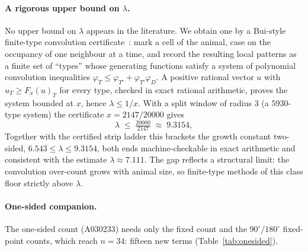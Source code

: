 \documentclass[11pt]{article}
\begin{document}
\paragraph{A rigorous upper bound on $\lambda$.}
No upper bound on $\lambda$ appears in the literature. We obtain one by a
Bui-style finite-type convolution certificate~\cite{bui2025}: mark a cell of the
animal, case on the occupancy of one neighbour at a time, and record the
resulting local patterns as a finite set of ``types'' whose generating functions
satisfy a system of polynomial convolution inequalities
$\varphi_T \le \varphi_{T'} + \varphi_{T'}\varphi_D$. A positive rational vector
$u$ with $u_T \ge F_x(u)_T$ for every type, checked in exact rational
arithmetic, proves the system bounded at $x$, hence $\lambda \le 1/x$. With a
split window of radius $3$ (a $5930$-type system) the certificate $x=2147/20000$
gives
\[
  \lambda \;\le\; \tfrac{20000}{2147} \;\approx\; 9.3154 ,
\]
Together with the
certified strip ladder this brackets the growth constant two-sided,
$6.543 \le \lambda \le 9.3154$, both ends machine-checkable in exact
arithmetic and consistent with the estimate $\lambda\approx7.111$. The gap
reflects a structural limit: the convolution over-count grows with animal
size, so finite-type methods of this class floor strictly above $\lambda$.

\paragraph{One-sided companion.}
The one-sided count (A030233) needs only the fixed count and the
$90^\circ$/$180^\circ$ fixed-point counts, which reach $n=34$: fifteen new
terms (Table~\ref{tab:onesided}).
\end{document}

